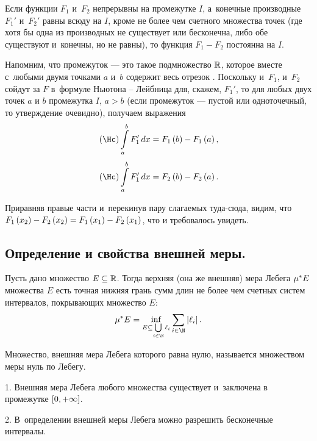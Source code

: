 \documentclass[draft]{article}
\begin{document}

Если функции $F_1$ и~$F_2$ непрерывны на промежутке $I$, а~конечные
производные $F_1'$ и~$F_2'$ равны всюду на $I$, кроме не более чем
счетного множества точек (где хотя бы одна из производных не
существует или бесконечна, либо обе существуют и~конечны, но не
равны), то функция $F_1-F_2$ постоянна на $I$.

\pr

Напомним, что промежуток --- это такое подмножество $\mathbb{R}$,
которое вместе с~любыми двумя точками $a$ и~$b$ содержит весь
отрезок \ab. Поскольку и~$F_1$, и~$F_2$ сойдут за $F$ в~формуле
Ньютона -- Лейбница для, скажем, $F_1'$, то для любых двух точек $a$
и $b$ промежутка $I$, $a>b$ (если промежуток --- пустой или
одноточечный, то утверждение очевидно), получаем выражения
$$\kurzh\intd[a,b]F_1',x=F_1\at(b)-F_1\at(a),$$
$$\kurzh\intd[a,b]F_1',x=F_2\at(b)-F_2\at(a).$$

Приравняв правые части и~перекинув пару слагаемых туда-сюда, видим,
что $F_1\at(x_2)-F_2\at(x_2)=F_1\at(x_1)-F_2\at(x_1)$, что и
требовалось увидеть.

\primp

\eject



\subsection{Определение и свойства внешней меры.}

\df Пусть дано множество $E\subseteq\mathbb{R}$. Тогда верхняя (она же
внешняя) мера Лебега $\mu^* E$ множества $E$ есть точная нижняя грань
сумм длин не более чем счетных систем интервалов, покрывающих
множество $E$:
$$\mes E = \inf\limits_{E\subseteq \bigcup\limits_{\inat}
  \li}\sum\limits_{\inat}\abs\li.$$

\df Множество, внешняя мера Лебега которого равна нулю, называется
множеством меры нуль по Лебегу.

\bigskip

\uts

\smallskip

1. Внешняя мера Лебега  любого множества существует и~заключена в
промежутке $\seg[0,{+\infty}]$.

\smallskip

2. В~определении внешней меры Лебега можно разрешить бесконечные
интервалы.
\end{document}
